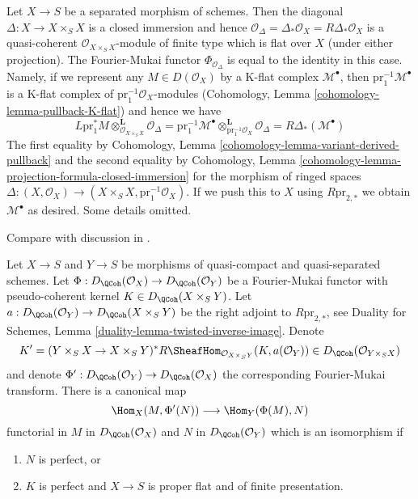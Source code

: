 \begin{example}
\label{example-diagonal-fourier-mukai}
Let $X \to S$ be a separated morphism of schemes. Then the diagonal
$\Delta : X \to X \times_S X$ is a closed immersion and hence
$\mathcal{O}_\Delta = \Delta_*\mathcal{O}_X = R\Delta_*\mathcal{O}_X$
is a quasi-coherent $\mathcal{O}_{X \times_S X}$-module of finite type
which is flat over $X$ (under either projection). The Fourier-Mukai functor
$\Phi_{\mathcal{O}_\Delta}$ is equal to the identity in this case.
Namely, if we represent any $M \in D(\mathcal{O}_X)$ by a K-flat
complex $\mathcal{M}^\bullet$, then $\text{pr}_1^{-1}\mathcal{M}^\bullet$
is a K-flat complex of $\text{pr}_1^{-1}\mathcal{O}_X$-modules
(Cohomology, Lemma \ref{cohomology-lemma-pullback-K-flat})
and hence we have
$$
L\text{pr}_1^*M \otimes_{\mathcal{O}_{X \times_S X}}^\mathbf{L}
\mathcal{O}_\Delta =
\text{pr}_1^{-1}\mathcal{M}^\bullet
\otimes_{\text{pr}_1^{-1}\mathcal{O}_X}^\mathbf{L}
\mathcal{O}_\Delta =
R\Delta_*(\mathcal{M}^\bullet)
$$
The first equality by Cohomology, Lemma
\ref{cohomology-lemma-variant-derived-pullback} and
the second equality by Cohomology, Lemma
\ref{cohomology-lemma-projection-formula-closed-immersion}
for the morphism of ringed spaces $\Delta : (X, \mathcal{O}_X) \to
(X \times_S X, \text{pr}_1^{-1}\mathcal{O}_X)$.
If we push this to $X$ using $R\text{pr}_{2, *}$
we obtain $\mathcal{M}^\bullet$ as desired. Some details omitted.
\end{example}

\begin{lemma}
\label{lemma-fourier-mukai-right-adjoint}
\begin{reference}
Compare with discussion in \cite{Rizzardo}.
\end{reference}
Let $X \to S$ and $Y \to S$ be morphisms of quasi-compact and quasi-separated
schemes. Let $\Phi : D_\QCoh(\mathcal{O}_X) \to D_\QCoh(\mathcal{O}_Y)$
be a Fourier-Mukai functor with pseudo-coherent kernel
$K \in D_\QCoh(X \times_S Y)$.
Let $a : D_\QCoh(\mathcal{O}_Y) \to  D_\QCoh(X \times_S Y)$
be the right adjoint to $R\text{pr}_{2, *}$, see
Duality for Schemes, Lemma \ref{duality-lemma-twisted-inverse-image}.
Denote
$$
K' = (Y \times_S X \to X \times_S Y)^*
R\SheafHom_{\mathcal{O}_{X \times_S Y}}(K, a(\mathcal{O}_Y)) \in
D_\QCoh(\mathcal{O}_{Y \times_S X})
$$
and denote $\Phi' : D_\QCoh(\mathcal{O}_Y) \to D_\QCoh(\mathcal{O}_X)$
the corresponding Fourier-Mukai transform. There is a canonical map
$$
\Hom_X(M, \Phi'(N)) \longrightarrow \Hom_Y(\Phi(M), N)
$$
functorial in $M$ in $D_\QCoh(\mathcal{O}_X)$ and $N$ in
$D_\QCoh(\mathcal{O}_Y)$ which is an isomorphism if
\begin{enumerate}
\item $N$ is perfect, or
\item $K$ is perfect and $X \to S$ is proper flat and of finite presentation.
\end{enumerate}
\end{lemma}

